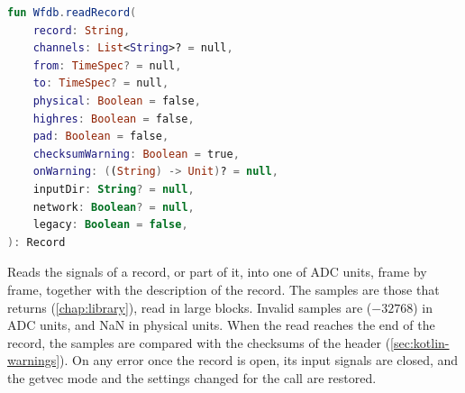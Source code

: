\begin{lstlisting}[language=Kotlin,style=signature]
fun Wfdb.readRecord(
    record: String,
    channels: List<String>? = null,
    from: TimeSpec? = null,
    to: TimeSpec? = null,
    physical: Boolean = false,
    highres: Boolean = false,
    pad: Boolean = false,
    checksumWarning: Boolean = true,
    onWarning: ((String) -> Unit)? = null,
    inputDir: String? = null,
    network: Boolean? = null,
    legacy: Boolean = false,
): Record
\end{lstlisting}
Reads the signals of a record, or part of it, into one  of ADC units,
frame by frame, together with the description of the record. The samples are those that
 returns (\cref{chap:library}), read in large blocks. Invalid samples are
 ($-32768$) in ADC units, and NaN in physical units. When the
read reaches the end of the record, the samples are compared with the checksums of the
header (\cref{sec:kotlin-warnings}). On any error once the record is open, its input
signals are closed, and the getvec mode and the settings changed for the call are
restored.
